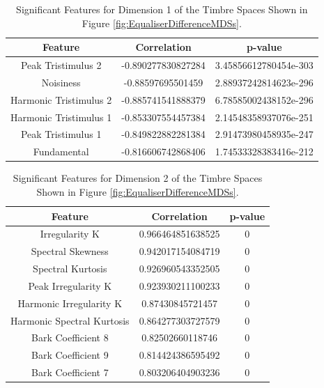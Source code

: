 	\begin{table}[h!]
		\centering
		\begin{tabular}{|c|c|c|}
			\hline
			\bf{Feature} & \bf{Correlation} & \bf{p-value} \\
			\hline
			\hline
			Peak Tristimulus 2 & -0.890277830827284 & 3.45856612780454e-303 \\
			\hline
			Noisiness & -0.88597695501459 & 2.88937242814623e-296 \\
			\hline
			Harmonic Tristimulus 2 & -0.885741541888379 & 6.78585002438152e-296 \\
			\hline
			Harmonic Tristimulus 1 & -0.853307554457384 & 2.14548358937076e-251 \\
			\hline
			Peak Tristimulus 1 & -0.849822882281384 & 2.91473980458935e-247 \\
			\hline
			Fundamental & -0.816606742868406 & 1.74533328383416e-212 \\
			\hline
		\end{tabular}
		\caption{Significant Features for Dimension 1 of the Timbre Spaces Shown in Figure 
			 \ref{fig:EqualiserDifferenceMDSs}.}
		\label{tab:EqualiserDifferenceFeatures}
	\end{table}

	\begin{table}[h!]
		\centering
		\begin{tabular}{|c|c|c|}
			\hline
			\bf{Feature} & \bf{Correlation} & \bf{p-value} \\
			\hline
			\hline
			Irregularity K & 0.966464851638525 & 0 \\
			\hline
			Spectral Skewness & 0.942017154084719 & 0 \\
			\hline
			Spectral Kurtosis & 0.926960543352505 & 0 \\
			\hline
			Peak Irregularity K & 0.923930211100233 & 0 \\
			\hline
			Harmonic Irregularity K & 0.87430845721457 & 0 \\
			\hline
			Harmonic Spectral Kurtosis & 0.864277303727579 & 0 \\
			\hline
			Bark Coefficient 8 & 0.82502660118746 & 0 \\
			\hline
			Bark Coefficient 9 & 0.814424386595492 & 0 \\
			\hline
			Bark Coefficient 7 & 0.803206404903236 & 0 \\
			\hline
		\end{tabular}
		\caption{Significant Features for Dimension 2 of the Timbre Spaces Shown in Figure 
			 \ref{fig:EqualiserDifferenceMDSs}.}
		\label{tab:EqualiserDifferenceFeatures}
	\end{table}
